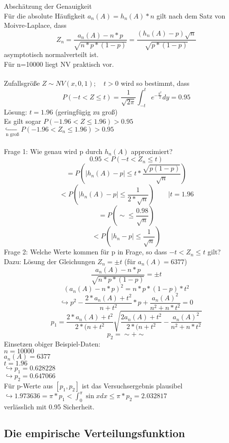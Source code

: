 \documentclass[a4paper,12pt]{scrartcl}
\begin{document}
  Abschätzung der Genauigkeit\\
  Für die absolute Häufigkeit $a_n(A) = h_n(A)*n$ gilt nach dem Satz von Moivre-Laplace, dass
  $$Z_n = \frac{a_n(A)-n*p}{\sqrt{n*p*(1-p)}}=\frac{(h_n(A)-p)\sqrt{n}}{\sqrt{p*(1-p)}}$$
  asymptotisch normalverteilt ist.\\
  Für n=10000 liegt NV praktisch vor.\\
  \\
  Zufallsgröße $Z\sim NV(x,0,1);\quad t>0$ wird so bestimmt, dass
  $$P(-t<Z\leq t) = \frac{1}{\sqrt{2\pi}}\int^t_{-t}e^{-\frac{y^2}{2}}dy = 0.95$$
  Lösung: $t=1.96$ (geringfügig zu groß)\\
  Es gilt sogar $P(-1.96<Z\leq1.96)>0.95$\\
  $\underset{\text{n groß}}{\hookrightarrow} P(-1.96<Z_n\leq 1.96) >0.95$\\
  \\
  Frage 1: Wie genau wird p durch $h_n(A)$ approximiert?
  $$0.95<P(-t<Z_n\leq t)$$
  $$=P(|h_n(A)-p| \leq t*\frac{\sqrt{p(1-p)}}{\sqrt{n}})$$
  $$< P(|h_n(A)-p|\leq \frac{1}{2*\sqrt{n}}) \quad\quad|t=1.96$$
  $$= P(\sim \leq \frac{0.98}{\sqrt{n}})$$
  $$<P(|h_n-p|\leq \frac{1}{\sqrt{n}})$$
  Frage 2: Welche Werte kommen für p in Frage, so dass $-t<Z_n\leq t$ gilt?\\
  Dazu: Lösung der Gleichungen $Z_n = \pm t$ (für $a_n(A)=6377$)
  $$\frac{a_n(A)-n*p}{\sqrt{n*p*(1-p)}}=\pm t$$
  $$(a_n(A)-n*p)^2 = n*p*(1-p)*t^2$$
  $$\hookrightarrow p^2-\frac{2*a_n(A)+t^2}{n+t^2}*p + \frac{a_n(A)^2}{n^2+n*t^2} = 0$$
  $$p_1 = \frac{2*a_n(A)+t^2}{2*(n+t^2}\sqrt{\frac{2 a_n(A)+t^2}{2*(n+t^2}-\frac{a_n(A)^2}{n^2+n*t^2}}$$
  $$p_2 = \sim + \sim $$
  Einsetzen obiger Beispiel-Daten:\\
  $n=10000$\\
  $a_n(A) = 6377$\\
  $t = 1.96$\\
  $\hookrightarrow p_1 = 0.628228$\\
  $\hookrightarrow p_2 = 0.647066$\\
  Für p-Werte aus $[p_1,p_2]$ ist das Versuchsergebnis plausibel\\
  $\hookrightarrow 1.973636 = \pi *p_1 < \int^\pi_0\sin x dx \leq \pi *p_2 = 2.032817$\\
  verlässlich mit 0.95 Sicherheit.
 
 \subsection{Die empirische Verteilungsfunktion}
 
\end{document}
